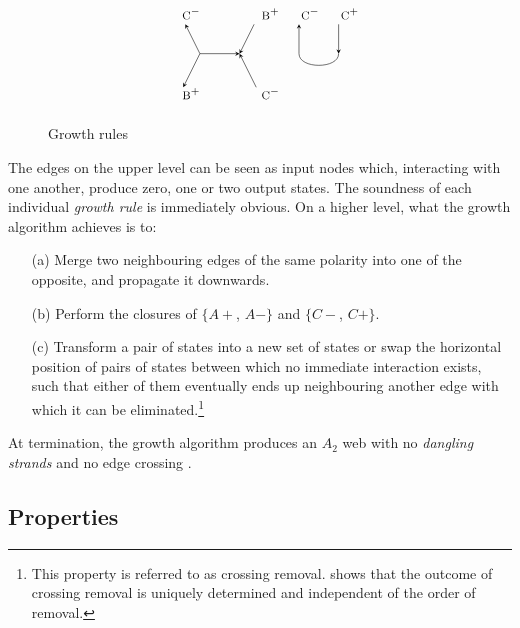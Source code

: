 \documentclass[nonatbib,numbers,10pt]{sigplanconf}
\begin{document}
\begin{figure}[h!]
\[\begin{tikzpicture}
\node (i33) at (7,-5) {$\textsc{\small C}^-$};
\node (ii33) at (9,-5) {$\textsc{\small B}^+$};
\node (d33) at (7.5,-6) {};
\node (dd33) at (8.5,-6) {};
\node (o33) at (7,-7) {$\textsc{\small B}^+$};
\node (oo33) at (9,-7) {$\textsc{\small C}^-$};
\draw[<-,>=stealth] (i33) -- (d33.center);
\draw[->,>=stealth] (ii33) -- (dd33.center);
\draw[->,>=stealth] (d33.center) -- (dd33.center);
\draw[->,>=stealth, shorten >=5pt] (d33.center) -- (o33.center);
\draw[<-,>=stealth, shorten >=5pt] (dd33.center) -- (oo33.center);

\node (i34) at (10,-5) {$\textsc{\small C}^-$};
\node (ii34) at (11,-5) {$\textsc{\small C}^+$};
\node (d34) at (10,-6) {};
\node (dd34) at (11,-6) {};
\draw[<-,>=stealth] (i34) -- (d34.center);
\draw[->,>=stealth] (ii34) -- (dd34.center);
\draw (d34.center) edge [-,>=stealth,bend right=90] (dd34.center);

\end{tikzpicture}
\]
\caption{Growth rules}
\label{fig:rules}
\end{figure}

The edges on the upper level can be seen as input nodes which, interacting with one another, produce zero, one or two output states. The soundness of each individual \textit{growth rule} is immediately obvious. On a higher level, what the growth algorithm achieves is to:
\begin{enumerate}
\item[(a)] Merge two neighbouring edges of the same polarity into one of the opposite, and propagate it downwards.
\item[(b)] Perform the closures of $\{A+$, $A-\}$ and $\{C-$, $C+\}$.
\item[(c)] Transform a pair of states into a new set of states or swap the horizontal position of pairs of states between which no immediate interaction exists, such that either of them eventually ends up neighbouring another edge with which it can be eliminated.\footnote{This property is referred to as crossing removal. \cite{petersen} shows that the outcome of crossing removal is uniquely determined and independent of the order of removal.}
\end{enumerate}

At termination, the growth algorithm produces an $A_2$ web with no \textit{dangling strands} and no edge crossing \cite{petersen}.
\subsection{Properties}
\end{document}
